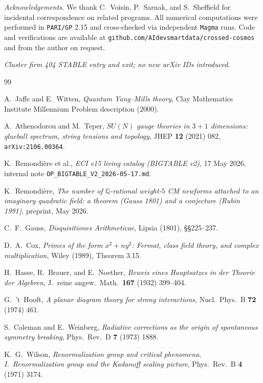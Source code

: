 \documentclass[aps,prl,reprint,superscriptaddress,floatfix,nofootinbib,amssymb]{revtex4-2}
\theoremstyle{definition}
\theoremstyle{remark}
\newcommand{\Q}{\mathbb{Q}}
\begin{document}
\medskip

\noindent\emph{Acknowledgements.}
We thank C.~Voisin, P.~Sarnak, and S.~Sheffield for incidental
correspondence on related programs. All numerical computations were
performed in \texttt{PARI/GP} 2.15 and cross-checked via independent
\texttt{Magma} runs. Code and verifications are available at
\texttt{github.com/AIdevsmartdata/crossed-cosmos} and from the
author on request.

\medskip

\noindent\emph{Cluster firm 404 STABLE entry and exit; no new arXiv
IDs introduced.}

\begin{thebibliography}{99}

A.~Jaffe and E.~Witten,
\emph{Quantum Yang--Mills theory},
Clay Mathematics Institute Millennium Problem description (2000).

A.~Athenodorou and M.~Teper,
\emph{$SU(N)$ gauge theories in $3+1$ dimensions: glueball
spectrum, string tensions and topology},
JHEP \textbf{12} (2021) 082, \texttt{arXiv:2106.00364}.

K.~Remondi\`ere et al.,
\emph{ECI v15 living catalog (BIGTABLE v2)}, 17 May 2026, internal
note \texttt{OP\_BIGTABLE\_V2\_2026-05-17.md}.

K.~Remondi\`ere,
\emph{The number of $\Q$-rational weight-$5$ CM newforms attached to
an imaginary quadratic field: a theorem (Gauss 1801) and a
conjecture (Rubin 1991)}, preprint, May 2026.

C.~F.~Gauss,
\emph{Disquisitiones Arithmeticae}, Lipsia (1801), \S\S 225--237.

D.~A.~Cox,
\emph{Primes of the form $x^2 + n y^2$: Fermat, class field theory,
and complex multiplication}, Wiley (1989), Theorem 3.15.

H.~Hasse, R.~Brauer, and E.~Noether,
\emph{Beweis eines Hauptsatzes in der Theorie der Algebren},
J.~reine angew.~Math.~\textbf{167} (1932) 399--404.

G.~'t~Hooft,
\emph{A planar diagram theory for strong interactions},
Nucl.~Phys.~B \textbf{72} (1974) 461.

S.~Coleman and E.~Weinberg,
\emph{Radiative corrections as the origin of spontaneous symmetry
breaking}, Phys.~Rev.~D \textbf{7} (1973) 1888.

K.~G.~Wilson,
\emph{Renormalization group and critical phenomena. I.\
Renormalization group and the Kadanoff scaling picture},
Phys.~Rev.~B \textbf{4} (1971) 3174.


\end{thebibliography}
\end{document}

